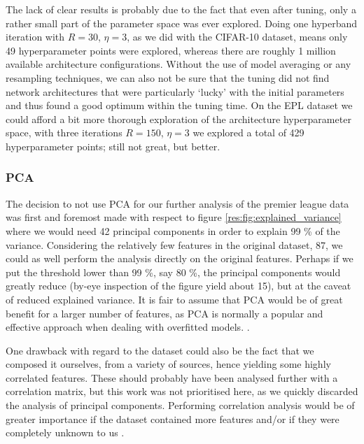     The lack of clear results is probably due to the fact that even after tuning, only a rather small part of the parameter space was ever explored. Doing one hyperband iteration with $R=30$, $\eta=3$, as we did with the CIFAR-10 dataset, means only 49 hyperparameter points were explored, whereas there are roughly 1 million available architecture configurations. Without the use of model averaging or any resampling techniques, we can also not be sure that the tuning did not find network architectures that were particularly `lucky' with the initial parameters and thus found a good optimum within the tuning time. On the EPL dataset we could afford a bit more thorough exploration of the architecture hyperparameter space, with three iterations $R=150$, $\eta=3$ we explored a total of 429 hyperparameter points; still not great, but better.


\subsubsection{PCA}
    The decision to not use PCA for our further analysis of the premier league data was first and foremost made with respect to figure \ref{res:fig:explained_variance} where we would need 42 principal components in order to explain 99 \% of the variance. Considering the relatively few features in the original dataset, 87, we could as well perform the analysis directly on the original features. Perhaps if we put the threshold lower than 99 \%, say 80 \%, the principal components would greatly reduce (by-eye inspection of the figure yield about 15), but at the caveat of reduced explained variance. It is fair to assume that PCA would be of great benefit for a larger number of features, as PCA is normally a popular and effective approach when dealing with overfitted models. .

    One drawback with regard to the dataset could also be the fact that we composed it ourselves, from a variety of sources, hence yielding some highly correlated features. These should probably have been analysed further with a correlation matrix, but this work was not prioritised here, as we quickly discarded the analysis of principal components. Performing correlation analysis would be of greater importance if the dataset contained more features and/or if they were completely unknown to us . 

